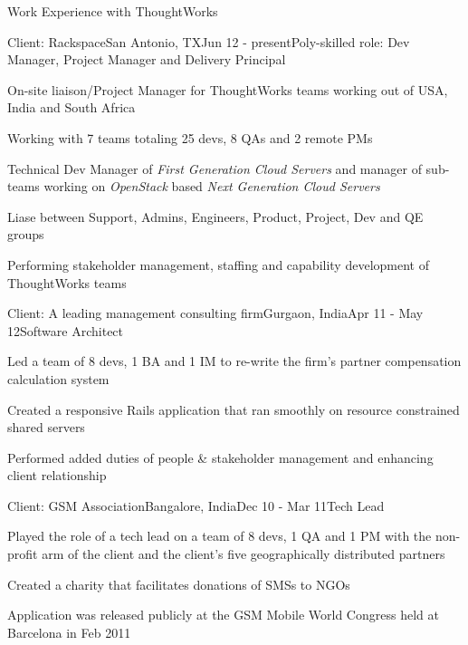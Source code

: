\documentclass{resume} %
\begin{document}

\begin{rSection}{Work Experience with ThoughtWorks}

\begin{rSubsection}{Client: Rackspace}{San Antonio, TX}{Jun 12 - present}{Poly-skilled role: Dev Manager, Project Manager and Delivery Principal}
\item On-site liaison/Project Manager for ThoughtWorks teams working
  out of USA, India and South Africa
\item Working with 7 teams totaling 25 devs, 8 QAs and 2 remote PMs
\item Technical Dev Manager of {\em First Generation Cloud Servers}
  and manager of sub-teams working on {\em OpenStack} based {\em Next Generation Cloud Servers}
\item Liase between Support, Admins, Engineers, Product, Project, Dev and QE groups
\item Performing stakeholder management, staffing and capability development of ThoughtWorks teams
\end{rSubsection}


\begin{rSubsection}{Client: A leading management consulting firm}{Gurgaon, India}{Apr 11 - May 12}{Software Architect}
\item Led a team of 8 devs, 1 BA and 1 IM to re-write the firm's partner compensation calculation system
\item Created a responsive Rails application that ran smoothly on resource constrained shared servers
\item Performed added duties of people \& stakeholder management and enhancing client relationship
\end{rSubsection}


\begin{rSubsection}{Client: GSM Association}{Bangalore, India}{Dec 10 - Mar 11}{Tech Lead}
\item Played the role of a tech lead on a team of 8 devs, 1 QA and 1
  PM with the non-profit arm of the client and the client's five
  geographically distributed partners
\item Created a charity that facilitates donations of SMSs to NGOs
\item Application was released publicly at the GSM Mobile World Congress held at Barcelona in Feb 2011
\end{rSubsection}



\end{rSection}
\end{document}
